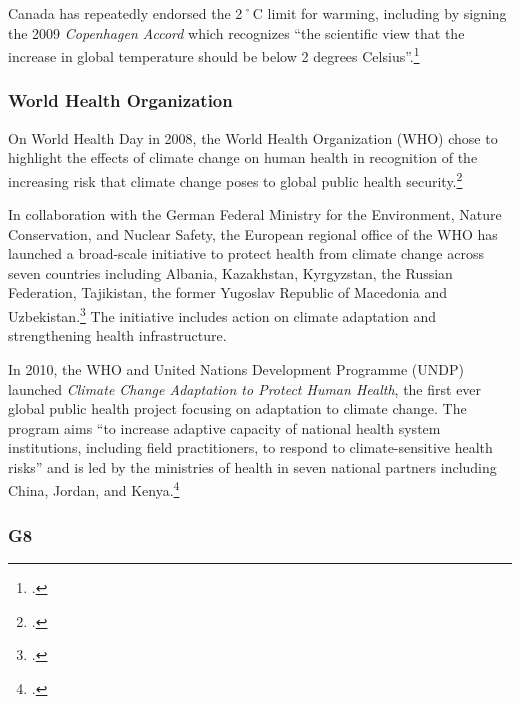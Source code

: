 \documentclass[10pt]{article}
\begin{document}
	

Canada has repeatedly endorsed the 2˚C limit for warming, including by signing the 2009 \emph{Copenhagen Accord} which recognizes ``the scientific view that the increase in global temperature should be below 2 degrees Celsius''.\footcite[][Article 1]{CopenhagenAccord}



	\subsubsection{World Health Organization}
	
	

On World Health Day in 2008, the World Health Organization (WHO) chose to highlight the effects of climate change on human health in recognition of the increasing risk that climate change poses to global public health security.\footcite[][]{WHOHealthDay2008}



In collaboration with the German Federal Ministry for the Environment, Nature Conservation, and Nuclear Safety, the European regional office of the WHO has launched a broad-scale initiative to protect health from climate change across seven countries including Albania, Kazakhstan, Kyrgyzstan, the Russian Federation, Tajikistan, the former Yugoslav Republic of Macedonia and Uzbekistan.\footcite[][]{WHOSevenCountry}
The initiative includes action on climate adaptation and strengthening health infrastructure.



In 2010, the WHO and United Nations Development Programme (UNDP) launched \emph{Climate Change Adaptation to Protect Human Health}, the first ever global public health project focusing on adaptation to climate change. 
The program aims ``to increase adaptive capacity of national health system institutions, including field practitioners, to respond to climate-sensitive health risks'' and is led by the ministries of health in seven national partners including China, Jordan, and Kenya.\footcite[][]{WHOProtectHumanHealth}



	\subsubsection{G8}
\end{document}
